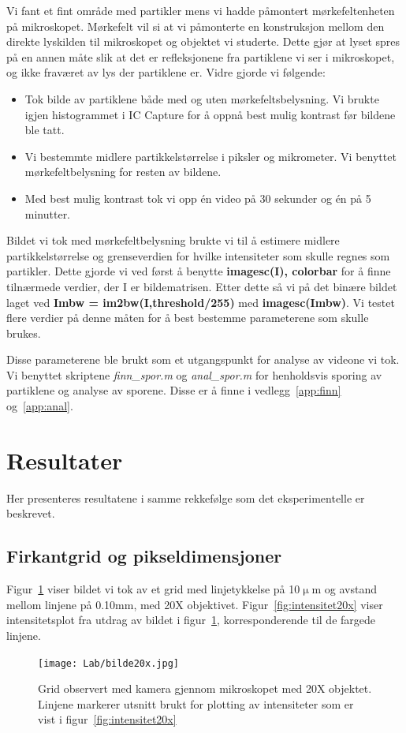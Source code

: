 \documentclass[a4paper,11pt, twocolumn]{article}
\begin{document}
Vi fant et fint område med partikler mens vi hadde påmontert mørkefeltenheten på mikroskopet. Mørkefelt vil si at vi påmonterte en konstruksjon mellom den direkte lyskilden til mikroskopet og objektet vi studerte. Dette gjør at lyset spres på en annen måte slik at det er refleksjonene fra partiklene vi ser i mikroskopet, og ikke fraværet av lys der partiklene er. Vidre gjorde vi følgende:
\begin{itemize}
	\item Tok bilde av partiklene både med og uten mørkefeltsbelysning. Vi brukte igjen histogrammet i IC Capture for å oppnå best mulig kontrast før bildene ble tatt.
	\item Vi bestemmte midlere partikkelstørrelse i piksler og mikrometer. Vi benyttet mørkefeltbelysning for resten av bildene.
	\item Med best mulig kontrast tok vi opp \'en video på 30 sekunder og \'en på 5 minutter.
\end{itemize}

Bildet vi tok med mørkefeltbelysning brukte vi til å estimere midlere partikkelstørrelse og grenseverdien for hvilke intensiteter som skulle regnes som partikler. Dette gjorde vi ved først å benytte {\bf imagesc(I), colorbar} for å finne tilnærmede verdier, der I er bildematrisen. Etter dette så vi på det binære bildet laget ved {\bf Imbw = im2bw(I,threshold/255)} med {\bf imagesc(Imbw)}. Vi testet flere verdier på denne måten for å best bestemme parameterene som skulle brukes.

Disse parameterene ble brukt som et utgangspunkt for analyse av videone vi tok. Vi benyttet skriptene \textit{finn\_spor.m} og \textit{anal\_spor.m} for henholdsvis sporing av partiklene og analyse av sporene. Disse er å finne i vedlegg~\ref{app:finn} og~\ref{app:anal}.

\section{Resultater}
Her presenteres resultatene i samme rekkefølge som det eksperimentelle er beskrevet.  \subsection{Firkantgrid og pikseldimensjoner}
Figur~\ref{fig:grid20x} viser bildet vi tok av et grid med linjetykkelse på 10$\upmu$m og avstand mellom linjene på 0.10mm, med 20X objektivet. Figur~\ref{fig:intensitet20x} viser intensitetsplot fra utdrag av bildet i figur~\ref{fig:grid20x}, korresponderende til de fargede linjene.  \begin{figure}[!ht]
	\centering
	\texttt{[image: Lab/bilde20x.jpg]}
	\caption{Grid observert med kamera gjennom mikroskopet med 20X objektet. Linjene markerer utsnitt brukt for plotting av intensiteter som er vist i figur~\ref{fig:intensitet20x}}
	\label{fig:grid20x}
\end{figure}
\end{document}
